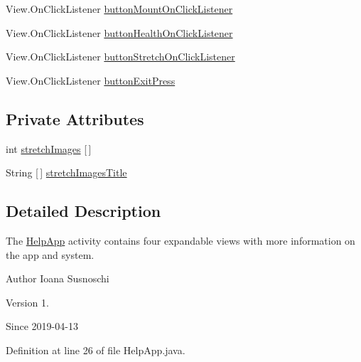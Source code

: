 \begin{DoxyCompactItemize}
View.\+On\+Click\+Listener \mbox{\hyperlink{classcom_1_1example_1_1trainawearapplication_1_1_help_app_a867b3994884da17cdd519275120bac5c}{button\+Mount\+On\+Click\+Listener}}
\item 
View.\+On\+Click\+Listener \mbox{\hyperlink{classcom_1_1example_1_1trainawearapplication_1_1_help_app_a7215e8639c2c138db908752e7e4657de}{button\+Health\+On\+Click\+Listener}}
\item 
View.\+On\+Click\+Listener \mbox{\hyperlink{classcom_1_1example_1_1trainawearapplication_1_1_help_app_a12ad30c134a550462ee8f928b2b21631}{button\+Stretch\+On\+Click\+Listener}}
\item 
View.\+On\+Click\+Listener \mbox{\hyperlink{classcom_1_1example_1_1trainawearapplication_1_1_help_app_a4a7e4e218561b27353446918c5c07f5b}{button\+Exit\+Press}}
\end{DoxyCompactItemize}
\subsection*{Private Attributes}
\begin{DoxyCompactItemize}
\item 
int \mbox{\hyperlink{classcom_1_1example_1_1trainawearapplication_1_1_help_app_a409e91221d680c3d801ea24a3f58fcdc}{stretch\+Images}} \mbox{[}$\,$\mbox{]}
\item 
String \mbox{[}$\,$\mbox{]} \mbox{\hyperlink{classcom_1_1example_1_1trainawearapplication_1_1_help_app_a3f603b19da94b591732a36617c2eb91d}{stretch\+Images\+Title}}
\end{DoxyCompactItemize}


\subsection{Detailed Description}
The \mbox{\hyperlink{classcom_1_1example_1_1trainawearapplication_1_1_help_app}{Help\+App}} activity contains four expandable views with more information on the app and system. 

\begin{DoxyAuthor}{Author}
Ioana Susnoschi 
\end{DoxyAuthor}
\begin{DoxyVersion}{Version}
1. 
\end{DoxyVersion}
\begin{DoxySince}{Since}
2019-\/04-\/13 
\end{DoxySince}


Definition at line 26 of file Help\+App.\+java.



